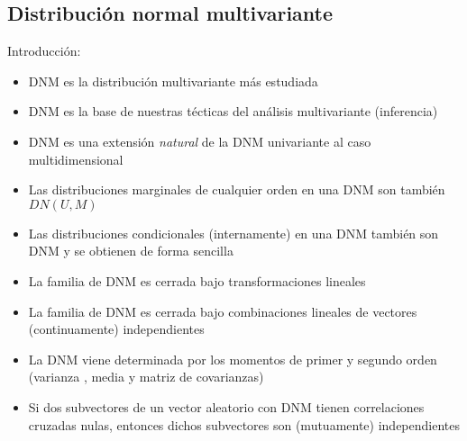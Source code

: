 \subsection{Distribución normal multivariante}
Introducción:
\begin{itemize}
\item DNM es la distribución multivariante más estudiada
\item DNM es la base de nuestras técticas del análisis multivariante (inferencia)
\item DNM es una extensión \emph{natural} de la DNM univariante al caso multidimensional
\item Las distribuciones marginales de cualquier orden en una DNM son también $DN(U,M)$
\item Las distribuciones condicionales (internamente) en una DNM también son DNM y se obtienen de forma sencilla
\item La familia de DNM es cerrada bajo transformaciones lineales
\item La familia de DNM es cerrada bajo combinaciones lineales de vectores (continuamente) independientes
\item La DNM viene determinada por los momentos de primer y segundo orden (varianza , media y matriz de covarianzas)
  \item Si dos subvectores de un vector aleatorio con DNM tienen correlaciones cruzadas nulas, entonces dichos subvectores son (mutuamente) independientes

\end{itemize}


